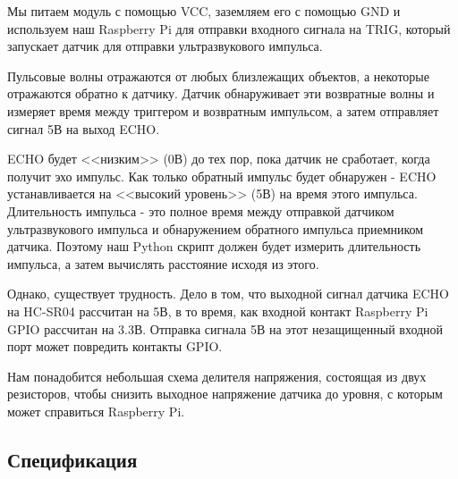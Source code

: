 \documentclass[a4paper, 14pt]{article}
\begin{document}
Мы питаем модуль с помощью VCC, заземляем его с помощью GND и используем наш Raspberry Pi для отправки входного сигнала на TRIG, который запускает датчик для отправки ультразвукового импульса.

Пульсовые волны отражаются от любых близлежащих объектов, а некоторые отражаются обратно к датчику. Датчик обнаруживает эти возвратные волны и измеряет время между триггером и возвратным импульсом, а затем отправляет сигнал 5В на выход ECHO.

ECHO будет <<низким>> (0В) до тех пор, пока датчик не сработает, когда получит эхо импульс. Как только обратный импульс будет обнаружен - ECHO устанавливается на <<высокий уровень>> (5В) на время этого импульса. Длительность импульса - это полное время между отправкой датчиком ультразвукового импульса и обнаружением обратного импульса приемником датчика. Поэтому наш Python скрипт должен будет измерить длительность импульса, а затем вычислять расстояние исходя из этого.

Однако, существует трудность. Дело в том, что выходной сигнал датчика ECHO на HC-SR04 рассчитан на 5В, в то время, как входной контакт Raspberry Pi GPIO рассчитан на 3.3В. Отправка сигнала 5В на этот незащищенный входной порт может повредить контакты GPIO.

Нам понадобится небольшая схема делителя напряжения, состоящая из двух резисторов, чтобы снизить выходное напряжение датчика до уровня, с которым может справиться Raspberry Pi.

\newpage
\subsection{Спецификация}
\end{document}
